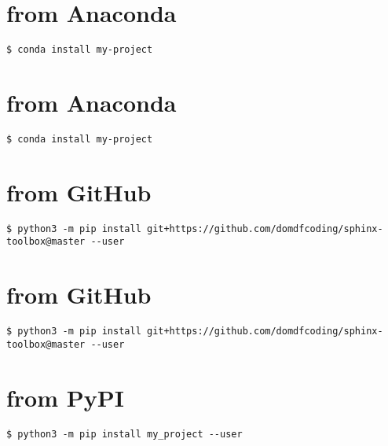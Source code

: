 \documentclass[letterpaper,10pt,english]{sphinxmanual}
\begin{document}
\chapter{from Anaconda}
\label{\detokenize{installation:installation-4-from_Anaconda}}\label{\detokenize{installation:installation-4}}
\begin{Verbatim}[commandchars=\\\{\}]
$ conda install my-project
\end{Verbatim}


\chapter{from Anaconda}
\label{\detokenize{installation:installation-5-from_Anaconda}}\label{\detokenize{installation:installation-5}}
\begin{Verbatim}[commandchars=\\\{\}]
$ conda install my-project
\end{Verbatim}


\chapter{from GitHub}
\label{\detokenize{installation:installation-6-from_GitHub}}\label{\detokenize{installation:installation-6}}
\begin{Verbatim}[commandchars=\\\{\}]
$ python3 -m pip install git+https://github.com/domdfcoding/sphinx-toolbox@master --user
\end{Verbatim}


\chapter{from GitHub}
\label{\detokenize{installation:installation-7-from_GitHub}}\label{\detokenize{installation:installation-7}}
\begin{Verbatim}[commandchars=\\\{\}]
$ python3 -m pip install git+https://github.com/domdfcoding/sphinx-toolbox@master --user
\end{Verbatim}


\chapter{from PyPI}
\label{\detokenize{installation:installation-8-from_PyPI}}\label{\detokenize{installation:installation-8}}
\begin{Verbatim}[commandchars=\\\{\}]
$ python3 -m pip install my_project --user
\end{Verbatim}
\end{document}
